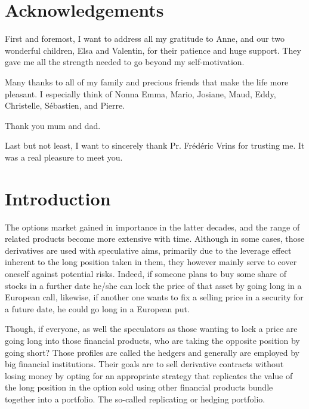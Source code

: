 \documentclass[a4paper, 12pt]{report}
\begin{document}
\chapter*{Acknowledgements}

First and foremost, I want to address all my gratitude to Anne, and our two wonderful children, Elsa and Valentin, for their patience and huge support. They gave me all the strength needed to go beyond my self-motivation.

Many thanks to all of my family and precious friends that make the life more pleasant. I especially think of Nonna Emma, Mario, Josiane, Maud, Eddy, Christelle, Sébastien, and Pierre. 

Thank you mum and dad.

Last but not least, I want to sincerely thank Pr. Frédéric Vrins for trusting me. It was a real pleasure to meet you.




{
\tableofcontents
\clearpage

\listoffigures
 \clearpage


\listoftables}
\clearpage



%
%
\chapter{Introduction}
\label{cha:Introduction}

The options market gained in importance in the latter decades, and the range of related products become more extensive with time.
Although in some cases, those derivatives are used with speculative aims, primarily due to the leverage effect inherent to the long position taken in them, they however mainly serve to cover oneself against potential risks.
Indeed, if someone plans to buy some share of stocks in a further date he/she can lock the price of that asset by going long in a European call, likewise, if another one wants to fix a selling price in a security for a future date, he could go long in a European put.

Though, if everyone, as well the speculators as those wanting to lock a price are going long into those financial products, who are taking the opposite position by going short?
Those profiles are called the hedgers and generally are employed by big financial institutions.
Their goals are to sell derivative contracts without losing money by opting for an appropriate strategy that replicates the value of the long position in the option sold using other financial products bundle together into a portfolio. The so-called replicating or hedging portfolio.
\end{document}
